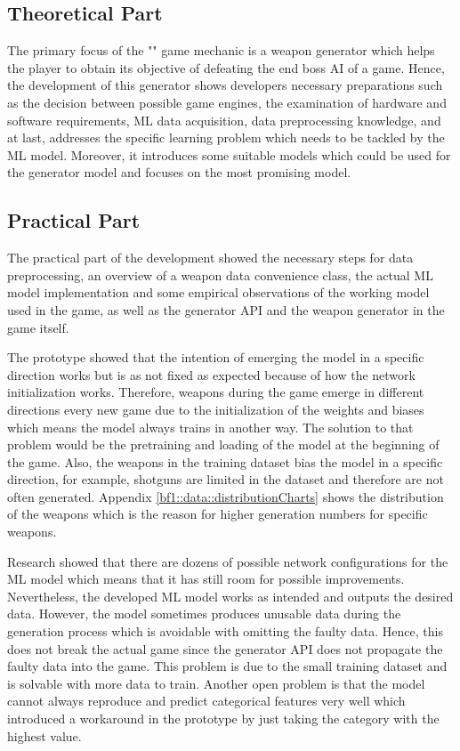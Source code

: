 \documentclass[MGS,Master,english]{twbook}%
\begin{document}
\subsection{Theoretical Part}
The primary focus of the "" game mechanic is a weapon generator which helps the player to obtain its objective of defeating the end boss AI of a game. Hence, the development of this generator shows developers necessary preparations such as the decision between possible game engines, the examination of hardware and software requirements, ML data acquisition, data preprocessing knowledge, and at last, addresses the specific learning problem which needs to be tackled by the ML model. Moreover, it introduces some suitable models which could be used for the generator model and focuses on the most promising model.

\subsection{Practical Part}
The practical part of the development showed the necessary steps for data preprocessing, an  overview of a weapon data convenience class, the actual ML model implementation and some empirical observations of the working model used in the game, as well as the generator API and the weapon generator in the game itself.

The prototype showed that the intention of emerging the model in a specific direction works but is as not fixed as expected because of how the network initialization works. Therefore, weapons during the game emerge in different directions every new game due to the initialization of the weights and biases which means the model always trains in another way. The solution to that problem would be the pretraining and loading of the model at the beginning of the game. Also, the weapons in the training dataset bias the model in a specific direction, for example, shotguns are limited in the dataset and therefore are not often generated. Appendix \ref{bf1::data::distributionCharts} shows the distribution of the weapons which is the reason for higher generation numbers for specific weapons. 

Research showed that there are dozens of possible network configurations for the ML model which means that it has still room for possible improvements. Nevertheless, the developed ML model works as intended and outputs the desired data. However, the model sometimes produces unusable data during the generation process which is avoidable with omitting the faulty data. Hence, this does not break the actual game since the generator API does not propagate the faulty data into the game. This problem is due to the small training dataset and is solvable with more data to train. Another open problem is that the model cannot always reproduce and predict categorical features very well which introduced a workaround in the prototype by just taking the category with the highest value.
\end{document}
